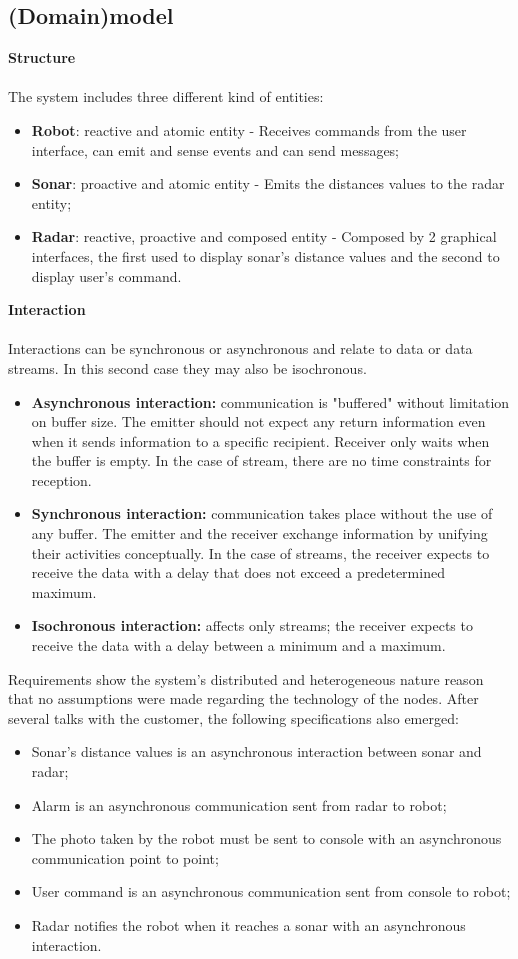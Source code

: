 \subsection{(Domain)model}
\textbf{Structure} \\\\
The system includes three different kind of entities:
\begin{itemize}
	\item \textbf{Robot}: reactive and atomic entity - Receives commands from the user interface, can emit and sense events and can send messages;
	\item \textbf{Sonar}: proactive and atomic entity - Emits the distances values to the radar entity;
	\item \textbf{Radar}: reactive, proactive and composed entity - Composed by 2 graphical interfaces, the first used to display sonar's distance values and the second to display user's command.
\end{itemize}
\textbf{Interaction} \\\\
Interactions can be synchronous or asynchronous and relate to data or data streams. In this second case they may also be isochronous. 
\begin{itemize}
	\item \textbf{Asynchronous interaction:} communication is "buffered" without limitation on buffer size. The emitter should not expect any return information even when it sends information to a specific recipient. Receiver only waits when the buffer is empty. In the case of stream, there are no time constraints for reception.
	\item \textbf{Synchronous interaction:} communication takes place without the use of any buffer. The emitter and the receiver exchange information by unifying their activities conceptually. In the case of streams, the receiver expects to receive the data with a delay that does not exceed a predetermined maximum.
	\item \textbf{Isochronous interaction:} affects only streams; the receiver expects to receive the data with a delay between a minimum and a maximum.
\end{itemize}
Requirements show the system's distributed and heterogeneous nature reason that no assumptions were made regarding the technology of the nodes. After several talks with the customer, the following specifications also emerged: 
\begin{itemize}
	\item Sonar's distance values is an asynchronous interaction between sonar and radar;
	\item Alarm is an asynchronous communication sent from radar to robot;
	\item The photo taken by the robot must be sent to console with an asynchronous communication point to point;
	\item User command is an asynchronous communication sent from console to robot;
	\item Radar notifies the robot when it reaches a sonar with an asynchronous interaction.
\end{itemize}
